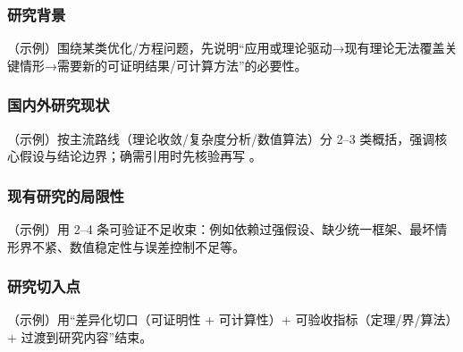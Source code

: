
\subsubsection{研究背景}
\justifying\indent
（示例）围绕某类优化/方程问题，先说明“应用或理论驱动→现有理论无法覆盖关键情形→需要新的可证明结果/可计算方法”的必要性。

\subsubsection{国内外研究现状}
\indent
（示例）按主流路线（理论收敛/复杂度分析/数值算法）分 2–3 类概括，强调核心假设与结论边界；确需引用时先核验再写 \cite{...}。

\subsubsection{现有研究的局限性}
\indent
（示例）用 2–4 条可验证不足收束：例如依赖过强假设、缺少统一框架、最坏情形界不紧、数值稳定性与误差控制不足等。

\subsubsection{研究切入点}
\indent
（示例）用“差异化切口（可证明性 + 可计算性）+ 可验收指标（定理/界/算法）+ 过渡到研究内容”结束。


